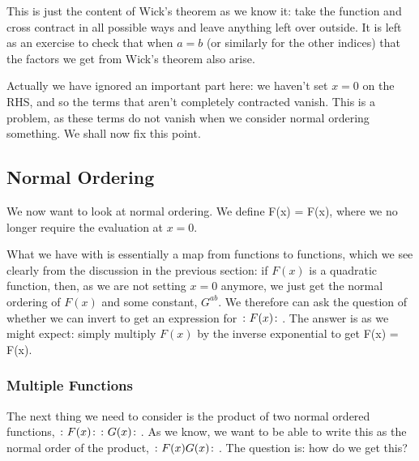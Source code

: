 This is just the content of Wick's theorem as we know it: take the function and cross contract in all possible ways and leave anything left over outside. It is left as an exercise to check that when $a=b$ (or similarly for the other indices) that the factors we get from Wick's theorem also arise. 

Actually we have ignored an important part here: we haven't set $x=0$ on the RHS, and so the terms that aren't completely contracted vanish. This is a problem, as these terms do not vanish when we consider normal ordering something. We shall now fix this point. 

\subsection{Normal Ordering}

We now want to look at normal ordering. We define 
\be 
\label{eqn:NormalOrdering}
    F(x) = \cl \exp{} F(x)\cl,
\ee 
where we no longer require the evaluation at $x=0$. 

What we have with  is essentially a map from functions to functions, which we see clearly from the discussion in the previous section: if $F(x)$ is a quadratic function, then, as we are not setting $x=0$ anymore, we just get the normal ordering of $F(x)$ and some constant, $G^{ab}$. We therefore can ask the question of whether we can invert  to get an expression for $\colon F(x)\colon$. The answer is as we might expect: simply multiply $F(x)$ by the inverse exponential to get 
\be 
\label{eqn:NormalOrderF}
    \cl F(x) \cl = \exp {} F(x).
\ee 

\subsubsection*{Multiple Functions}

The next thing we need to consider is the product of two normal ordered functions, $\colon F(x)\colon \colon G(x)\colon$. As we know, we want to be able to write this as the normal order of the product, $\colon F(x)G(x)\colon$. The question is: how do we get this? 

